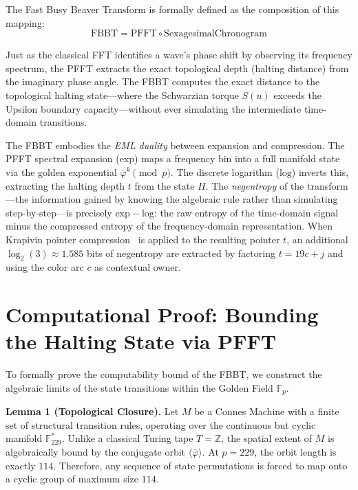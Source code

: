 The Fast Busy Beaver Transform is formally defined as the composition of this mapping:
\begin{equation}
    \text{FBBT} = \text{PFFT} \circ \text{SexagesimalChronogram}
\end{equation}

Just as the classical FFT identifies a wave's phase shift by observing its frequency spectrum, the PFFT extracts the exact topological depth (halting distance) from the imaginary phase angle. The FBBT computes the exact distance to the topological halting state---where the Schwarzian torque $S(u)$ exceeds the Upsilon boundary capacity---without ever simulating the intermediate time-domain transitions.

\begin{remark}
The FBBT embodies the \emph{EML duality} between expansion and compression. The PFFT spectral expansion ($\mathrm{exp}$) maps a frequency bin into a full manifold state via the golden exponential $\bar\varphi^k \pmod{p}$. The discrete logarithm ($\mathrm{log}$) inverts this, extracting the halting depth $t$ from the state $H$. The \emph{negentropy} of the transform---the information gained by knowing the algebraic rule rather than simulating step-by-step---is precisely $\mathrm{exp} - \mathrm{log}$: the raw entropy of the time-domain signal minus the compressed entropy of the frequency-domain representation. When Krapivin pointer compression~\cite{krapivin2025optimal} is applied to the resulting pointer $t$, an additional $\log_2(3) \approx 1.585$ bits of negentropy are extracted by factoring $t = 19c + j$ and using the color arc $c$ as contextual owner.
\end{remark}

\section{Computational Proof: Bounding the Halting State via PFFT}

To formally prove the computability bound of the FBBT, we construct the algebraic limits of the state transitions within the Golden Field $\mathbb{F}_{p}$. 

\textbf{Lemma 1 (Topological Closure).} Let $M$ be a Connes Machine with a finite set of structural transition rules, operating over the continuous but cyclic manifold $\mathbb{F}_{229}^*$. Unlike a classical Turing tape $T = \mathbb{Z}$, the spatial extent of $M$ is algebraically bound by the conjugate orbit $\langle \bar{\varphi} \rangle$. At $p=229$, the orbit length is exactly $114$. Therefore, any sequence of state permutations is forced to map onto a cyclic group of maximum size $114$.

